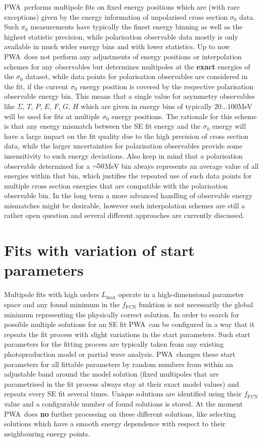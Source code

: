 \documentclass[a4paper,10pt]{article}
\def\PWA{\ttfamily PWA\rmfamily\ }
\begin{document}
\PWA performs multipole fits on fixed energy positions which are (with rare exceptions) given by the energy information of
unpolarised cross section $\sigma_0$ data. Such $\sigma_0$ measurements have typically the finest energy binning as well as
the highest statistic precision, while polarisation observable data mostly is only available in much wider energy bins and
with lower statistics.
Up to now \PWA does not perform any adjustments of energy positions or interpolation schemes for any observables
but determines multipoles at the \textbf{exact} energies of the $\sigma_0$ dataset, while data points for 
polarisation observables are considered in the fit, if the current $\sigma_0$ energy position is covered
by the respective polarisation observable energy bin. This means that a single value for asymmetry observables like
$\Sigma$, $T$, $P$, $E$, $F$, $G$, $H$ which are given in energy bins of typically $20...100$\:MeV will be used
for fits at multiple $\sigma_0$ energy positions.
The rationale for this scheme is that any energy mismatch between the SE fit energy and the $\sigma_0$ energy
will have a large impact on the fit quality due to the high precision of cross section data, while 
the larger uncertainties for polarisation observables provide some insensitivity to such energy deviations.
Also keep in mind that a polarisation observable determined for a $\sim\hspace{-0.4em}50$\:MeV bin always represents an average
value of all energies within that bin, which justifies the repeated use of such data points for multiple
cross section energies that are compatible with the polarisation observable bin.
In the long term a more advanced handling of observable energy mismatches might be desirable,
however such interpolation schemes are still a rather open question and several different approaches 
are currently discussed.

\section{Fits with variation of start parameters}

Multipole fits with high orders $L_\mathrm{max}$ operate in a high-dimensional parameter space and
any found minimum in the $f_\mathrm{FCN}$ funktion is not necessarily the global minimum
representing the physically correct solution. In order to search for possible multiple
solutions for an SE fit \PWA can be configured in a way that it repeats the fit process with
slight variations in the start parameters.
Such start parameters for the fitting process are typically taken from any existing photoproduction model or
partial wave analysis. \PWA changes these start parameters for all fittable parameters by random numbers
from within an adjustable band around the model solution (fixed multipoles that are parametrised in the fit process
always stay at their exact model values) and repeats every SE fit several times. Unique solutions 
are identified using their $f_\mathrm{FCN}$ value and a configurable number of found solutions is stored. 
At the moment \PWA does \textbf{no} further processing on these different solutions, like selecting solutions which 
have a smooth energy dependence with respect to their neighbouring energy points.
\end{document}
